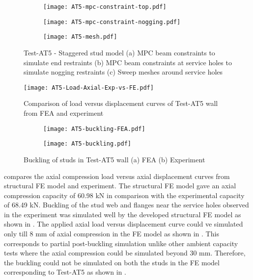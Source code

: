 \begin{figure}[!htbp]
	\centering
	\begin{subfigure}[b]{0.3\textwidth}
		\centering
		\texttt{[image: AT5-mpc-constraint-top.pdf]}
		\caption{}
		\label{subfig:AT5-mpc-constraint-top}
	\end{subfigure}
	\begin{subfigure}[b]{0.5\textwidth}
		\centering
		\texttt{[image: AT5-mpc-constraint-nogging.pdf]}
		\caption{}
		\label{subfig:AT5-mpc-constraint-nogging}
	\end{subfigure}
	\begin{subfigure}[b]{0.5\textwidth}
		\centering
		\texttt{[image: AT5-mesh.pdf]}
		\caption{}
		\label{subfig:AT5-mesh}
	\end{subfigure}
	   \caption{Test-AT5 - Staggered stud model (a) MPC beam constraints to simulate end restraints (b) MPC beam constraints at service holes to simulate nogging restraints (c) Sweep meshes around service holes}
	   \label{fig:AT5-modelling-fea}
\end{figure} 
\begin{figure}[!htbp]
	\centering
		\texttt{[image: AT5-Load-Axial-Exp-vs-FE.pdf]}\\
		\caption{Comparison of load versus displacement curves of Test-AT5 wall from FEA and experiment}
	\label{fig:AT5-fea}
\end{figure}
\begin{figure}[!htbp]
	\centering
	\begin{subfigure}[b]{0.4\textwidth}
		\centering
		\texttt{[image: AT5-buckling-FEA.pdf]}
		\caption{}
		\label{subfig:AT5-buckling-FEA}
	\end{subfigure}
	\begin{subfigure}[b]{0.4\textwidth}
		\centering
		\texttt{[image: AT5-buckling.pdf]}
		\caption{}
		\label{subfig:AT5-buckling-experiment}
	\end{subfigure}
	   \caption{Buckling of studs in Test-AT5 wall (a) FEA (b) Experiment}
	   \label{fig:AT5-buckling-fea-comparison}
\end{figure} 

 compares the axial compression load versus axial displacement curves from structural FE model and experiment. The structural FE model gave an axial compression capacity of 60.98 kN in comparison with the experimental capacity of 68.49 kN. Buckling of the stud web and flanges near the service holes observed in the experiment was simulated well by the developed structural FE model as shown in . The applied axial load versus displacement curve could ve simulated only till 8 mm of axial compression in the FE model as shown in . This corresponds to partial post-buckling simulation unlike other ambient capacity tests where the axial compression could be simulated beyond 30 mm. Therefore, the buckling could not be simulated on both the studs in the FE model corresponding to Test-AT5 as shown in . 


